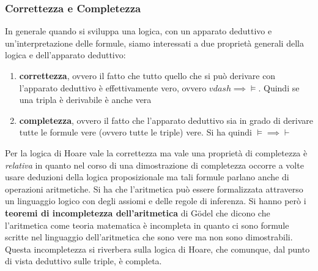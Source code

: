 \documentclass[a4paper,12pt, oneside]{book}
\begin{document}
\subsubsection{Correttezza e Completezza}
In generale quando si sviluppa una logica, con un apparato deduttivo e
un'interpretazione delle formule, siamo interessati a due proprietà generali
della logica e dell'apparato deduttivo:
\begin{enumerate}
  \item \textbf{correttezza}, ovvero il fatto che tutto quello che si può
  derivare con l'apparato deduttivo è effettivamente vero, ovvero
  $vdash\implies\vDash$. Quindi se una tripla è derivabile è anche vera
  \item \textbf{completezza}, ovvero il fatto che l'apparato deduttivo sia in
  grado di derivare tutte le formule vere (ovvero tutte le triple) vere. Si ha
  quindi $\vDash\implies\vdash$
\end{enumerate}
Per la logica di Hoare vale la correttezza ma vale una proprietà di completezza
è \textit{relativa} in quanto nel corso di una dimostrazione di completezza
occorre a volte usare deduzioni della logica proposizionale ma tali formule
parlano anche di operazioni aritmetiche. Si ha che l'aritmetica può essere
formalizzata attraverso un linguaggio logico con degli assiomi e delle regole di
inferenza. Si hanno però i \textbf{teoremi di incompletezza dell'aritmetica} di
G\"{o}del che dicono che l'aritmetica come teoria matematica è incompleta in
quanto ci sono formule scritte nel linguaggio dell'aritmetica che sono vere ma
non sono dimostrabili. Questa incompletezza si riverbera sulla logica di Hoare,
che comunque, dal punto di vista deduttivo sulle triple, è completa.
\end{document}
